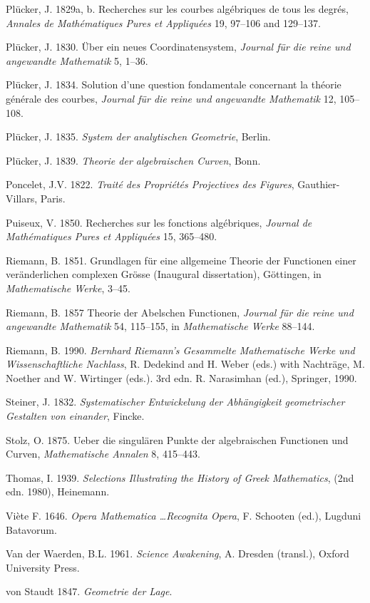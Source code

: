 \documentclass[11pt]{article}
\begin{document}
\noindent Pl\"ucker, J. 1829a, b. Recherches sur les courbes alg\'ebriques de tous les degr\'es, \emph{Annales de Math\'e\-matiques Pures et Appliqu\'ees} 19, 97--106 and 129--137.
 
\noindent Pl\"ucker, J. 1830. \"Uber ein neues Coordinatensystem, \emph{Journal f\"ur die reine und angewandte Mathematik} 5, 1--36.
 
\noindent Pl\"ucker, J. 1834. Solution d'une question fondamentale concernant la th\'eorie g\'en\'erale des courbes, \emph{Journal f\"ur die reine und angewandte Mathematik} 12, 105--108.

\noindent Pl\"ucker, J. 1835. \emph{System der analytischen Geometrie}, Berlin.
 
\noindent Pl\"ucker, J. 1839. \emph{Theorie der algebraischen Curven}, Bonn.
 
\noindent Poncelet, J.V. 1822. \emph{Trait\'{e} des Propri\'{e}t\'{e}s Projectives des Figures}, Gauthier-Villars, Paris.

\noindent Puiseux, V. 1850. Recherches sur les fonctions alg\'ebriques, \emph{Journal de Math\'ematiques Pures et Appliqu\'ees} 15, 365--480.

\noindent Riemann, B. 1851.  Grundlagen f\"ur eine allgemeine Theorie der Functionen einer ver\"anderlichen complexen Gr\"osse (Inaugural dissertation), G\"ottingen, in \emph{Mathematische Werke}, 3--45.

 \noindent Riemann, B. 1857  Theorie der Abelschen Functionen, \emph{Journal f\"ur die reine und angewandte Mathematik}  54, 115--155, in \emph{Mathematische Werke} 88--144.
 
 \noindent  Riemann, B. 1990. \emph{Bernhard Riemann's Gesammelte Mathematische Werke und Wissenschaft\-liche Nachlass}, R. Dedekind and  H. Weber (eds.)  with Nach\-tr\"age, M. Noether and W. Wirtinger (eds.). 3rd edn. R. Narasimhan (ed.), Springer, 1990.
 
  \noindent   Steiner, J. 1832. \emph{Systematischer Entwickelung der Abh\"angigkeit geometri\-scher Gestalten von einander}, Fincke.

 \noindent Stolz, O.  1875. Ueber die singul\"aren Punkte der algebraischen Functionen und Curven, \emph{Mathematische Annalen} 8, 415--443. 


\noindent Thomas, I. 1939. \emph{Selections Illustrating the History of Greek Mathematics}, (2nd edn. 1980), Heinemann.

 \noindent Vi\`ete  F. 1646.  \emph{Opera Mathematica \ldots Recognita Opera}, F.  Schooten (ed.), Lugduni Batavorum.
 
\noindent Van der Waerden, B.L. 1961. \emph{Science Awakening}, A. Dresden (transl.), Oxford University Press.
 
 \noindent von Staudt  1847. \emph{Geometrie der Lage}.
 
 
 
 
 
 
 
\end{document}
